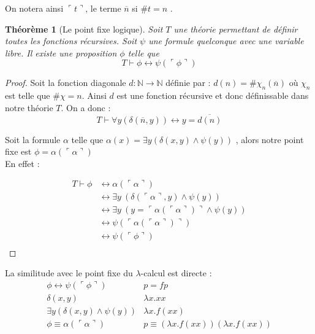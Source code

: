 \documentclass[11pt]{book}
\newtheorem{theoreme}{Théorème}
\begin{document}
On notera ainsi $\ulcorner t \urcorner$, le terme $\overline{n}$  si 
$\# t =n$ . 


\begin{theoreme}[Le point fixe logique]
	Soit $T$ une théorie permettant de définir toutes les fonctions récursives.
	Soit $\psi$ une formule quelconque avec une variable libre. Il existe une proposition $\phi$ telle que
	$$ T \vdash \phi \leftrightarrow \psi (\ulcorner \phi\urcorner ) $$
\end{theoreme}
\begin{proof}
	Soit la fonction diagonale $d : \mathbb{N} \rightarrow \mathbb{N} $ définie par :
	$ d(n)= \# \chi _n(\overline{n})$ où $\chi_n$ est telle que $\# \chi =n$. Ainsi $d$ 
	est une fonction récursive et donc définissable dans notre théorie $T$. On a donc :
	$$T \vdash \forall y (\delta(\overline{n}, y)) \leftrightarrow y=\overline{d(n)} $$

	Soit la formule $\alpha$ telle que $\alpha (x)=\exists y (\delta(x,y) \land \psi(y))$
	, alors notre point fixe est $\phi = \alpha (\ulcorner \alpha \urcorner )$ \\
	En effet :

	\begin{align*}
	 T \vdash \phi & \leftrightarrow \alpha(\ulcorner \alpha \urcorner ) \\
	                 & \leftrightarrow \exists y\ (\delta( \ulcorner \alpha \urcorner , y) \land \psi (y)) \\
	                 & \leftrightarrow \exists y\ (y=\ulcorner \alpha(\ulcorner \alpha  \urcorner)\urcorner \land \psi (y)) \\
	                 & \leftrightarrow \psi (\ulcorner \alpha(\ulcorner \alpha \urcorner)\urcorner)  \\
	                 & \leftrightarrow \psi (\ulcorner \phi \urcorner ) \\
	\end{align*}
\end{proof}


La similitude avec le point fixe du $\lambda$-calcul est directe :
$$
\begin{array}{c|c}
 \phi \leftrightarrow \psi (\ulcorner \phi\urcorner ) & p = fp \\
 \delta(x,y) & \lambda x.xx \\
 \exists y (\delta(x,y) \land \psi(y)) & \lambda x.f (x x) \\
 \phi \equiv \alpha(\ulcorner \alpha \urcorner) & p \equiv (\lambda x.f(xx)) (\lambda x.f(xx)) \\
\end{array}
$$
\end{document}
